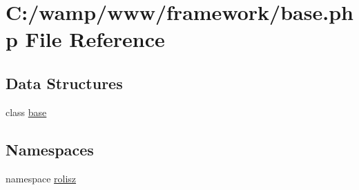 \hypertarget{base_8php}{
\section{C:/wamp/www/framework/base.php File Reference}
\label{base_8php}
}
\subsection*{Data Structures}
\begin{DoxyCompactItemize}
\item 
class \hyperlink{classbase}{base}
\end{DoxyCompactItemize}
\subsection*{Namespaces}
\begin{DoxyCompactItemize}
\item 
namespace \hyperlink{namespacerolisz}{rolisz}
\end{DoxyCompactItemize}
